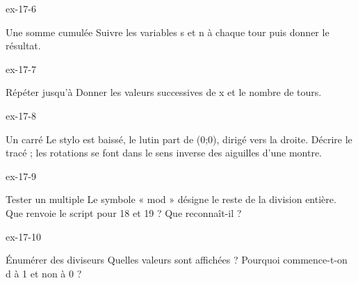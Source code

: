 \clearpage{}
\begin{blocLivre}{ex-17-6}\begin{exercice}[2]{Une somme cumulée}
Suivre les variables s et n à chaque tour puis donner le résultat.
\label{fig-ex-17-6}
\end{exercice}\end{blocLivre}
\begin{blocLivre}{ex-17-7}\begin{exercice}[2]{Répéter jusqu’à}
Donner les valeurs successives de x et le nombre de tours.
\label{fig-ex-17-7}
\end{exercice}\end{blocLivre}
\begin{blocLivre}{ex-17-8}\begin{exercice}[2]{Un carré}
Le stylo est baissé, le lutin part de (0;0), dirigé vers la droite. Décrire le tracé ; les rotations se font dans le sens inverse des aiguilles d’une montre.
\label{fig-ex-17-8}
\end{exercice}\end{blocLivre}
\begin{blocLivre}{ex-17-9}\begin{exercice}[2]{Tester un multiple}
Le symbole « mod » désigne le reste de la division entière. Que renvoie le script pour 18 et 19 ? Que reconnaît-il ?
\label{fig-ex-17-9}
\end{exercice}\end{blocLivre}
\begin{blocLivre}{ex-17-10}\begin{exercice}[2]{Énumérer des diviseurs}
Quelles valeurs sont affichées ? Pourquoi commence-t-on d à 1 et non à 0 ?
\label{fig-ex-17-10}
\end{exercice}\end{blocLivre}

